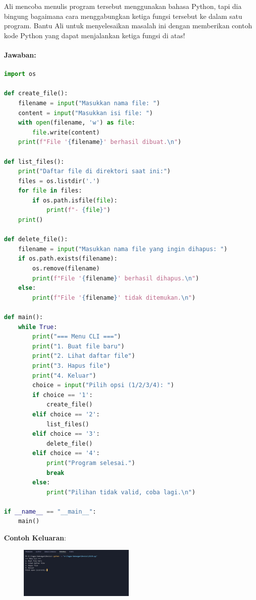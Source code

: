 \documentclass[12pt]{article}
\begin{document}
Ali mencoba menulis program tersebut menggunakan bahasa Python, tapi dia bingung bagaimana cara menggabungkan ketiga fungsi tersebut ke dalam satu program. Bantu Ali untuk menyelesaikan masalah ini dengan memberikan contoh kode Python yang dapat menjalankan ketiga fungsi di atas!


\paragraph{Jawaban:}

\begin{lstlisting}[language=Python]
import os  

def create_file():
    filename = input("Masukkan nama file: ")
    content = input("Masukkan isi file: ")
    with open(filename, 'w') as file:
        file.write(content)
    print(f"File '{filename}' berhasil dibuat.\n")

def list_files():
    print("Daftar file di direktori saat ini:")
    files = os.listdir('.')  
    for file in files:
        if os.path.isfile(file):  
            print(f"- {file}")
    print()

def delete_file():
    filename = input("Masukkan nama file yang ingin dihapus: ")
    if os.path.exists(filename): 
        os.remove(filename)
        print(f"File '{filename}' berhasil dihapus.\n")
    else:
        print(f"File '{filename}' tidak ditemukan.\n")

def main():
    while True:
        print("=== Menu CLI ===")
        print("1. Buat file baru")
        print("2. Lihat daftar file")
        print("3. Hapus file")
        print("4. Keluar")
        choice = input("Pilih opsi (1/2/3/4): ")
        if choice == '1':
            create_file()
        elif choice == '2':
            list_files()
        elif choice == '3':
            delete_file()
        elif choice == '4':
            print("Program selesai.")
            break
        else:
            print("Pilihan tidak valid, coba lagi.\n")

if __name__ == "__main__":
    main()
\end{lstlisting}


\textbf{Contoh Keluaran}:


\begin{figure}[h]
    \centering
    \includegraphics[width=0.5\textwidth]{asset/Output_Asignment4.jpg}
    \label{fig:contohgambar}
\end{figure}
\end{document}
